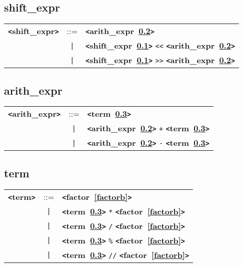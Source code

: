\documentclass[12pt]{article}
\begin{document}
\subsection{shift\_expr}
\label{shiftzzzexprb}
\begin{tabular}{lcl}
{\bf \verb+<+shift\_expr\verb+>+} & ::=  & {\bf \verb+<+arith\_expr~\ref{arithzzzexprb}\verb+>+}  \\
 & \verb+|+  & {\bf \verb+<+shift\_expr~\ref{shiftzzzexprb}\verb+>+}  \verb|<<| {\bf \verb+<+arith\_expr~\ref{arithzzzexprb}\verb+>+}  \\
 & \verb+|+  & {\bf \verb+<+shift\_expr~\ref{shiftzzzexprb}\verb+>+}  \verb|>>| {\bf \verb+<+arith\_expr~\ref{arithzzzexprb}\verb+>+}  \\
\end{tabular}

\subsection{arith\_expr}
\label{arithzzzexprb}
\begin{tabular}{lcl}
{\bf \verb+<+arith\_expr\verb+>+} & ::=  & {\bf \verb+<+term~\ref{termb}\verb+>+}  \\
 & \verb+|+  & {\bf \verb+<+arith\_expr~\ref{arithzzzexprb}\verb+>+}  \verb|+| {\bf \verb+<+term~\ref{termb}\verb+>+}  \\
 & \verb+|+  & {\bf \verb+<+arith\_expr~\ref{arithzzzexprb}\verb+>+}  \verb|-| {\bf \verb+<+term~\ref{termb}\verb+>+}  \\
\end{tabular}

\subsection{term}
\label{termb}
\begin{tabular}{lcl}
{\bf \verb+<+term\verb+>+} & ::=  & {\bf \verb+<+factor~\ref{factorb}\verb+>+}  \\
 & \verb+|+  & {\bf \verb+<+term~\ref{termb}\verb+>+}  \verb|*| {\bf \verb+<+factor~\ref{factorb}\verb+>+}  \\
 & \verb+|+  & {\bf \verb+<+term~\ref{termb}\verb+>+}  \verb|/| {\bf \verb+<+factor~\ref{factorb}\verb+>+}  \\
 & \verb+|+  & {\bf \verb+<+term~\ref{termb}\verb+>+}  \verb|%| {\bf \verb+<+factor~\ref{factorb}\verb+>+}  \\
 & \verb+|+  & {\bf \verb+<+term~\ref{termb}\verb+>+}  \verb|//| {\bf \verb+<+factor~\ref{factorb}\verb+>+}  \\
\end{tabular}
\end{document}
